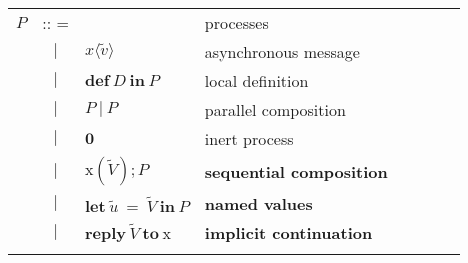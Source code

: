 \begin{table}[h]
  \begin{center}
  \begin{tabular}{ l c l  l l c l  p{\textwidth} }
$P$  & :: =  &                                               & processes                      \\
 & $|$ & $x \langle \widetilde{v} \rangle $   & asynchronous message \\
 & $|$ & $ \mathbf{def}\ D\ \mathbf{in}\ P$ & local definition                \\
 & $|$ & $P\ |\ P$                                        & parallel composition       \\
 & $|$ & $\mathbf{0}$                                 & inert process                  \\
 & $|$ & $\mathrm{x}(\widetilde{V});P$       & \bf{sequential composition} \\
 & $|$ & $\mathbf{let}\ \widetilde{u}\ =\ \widetilde{V}\ \mathbf{in}\ P$& \bf{named values} \\
 & $|$ & $\mathbf{reply}\  \widetilde{V}\ \mathbf{to}\ \mathrm{x}$     & \bf{implicit continuation} \\
 &&&\\
 

\end{tabular}
\end{center}
\end{table}
